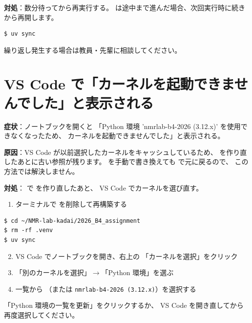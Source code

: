 \textbf{対処}：数分待ってから再実行する。
 は途中まで進んだ場合、次回実行時に続きから再開します。

\begin{wslbox}[再実行]
\begin{lstlisting}[style=bash]
$ uv sync
\end{lstlisting}
\end{wslbox}

繰り返し発生する場合は教員・先輩に相談してください。

\section{VS Code で「カーネルを起動できませんでした」と表示される}

\textbf{症状}：ノートブックを開くと
「Python 環境 'nmrlab-b4-2026 (3.12.x)' を使用できなくなったため、
カーネルを起動できませんでした」と表示される。

\textbf{原因}：VS Code が以前選択したカーネルをキャッシュしているため、
 を作り直したあとに古い参照が残ります。
 を手動で書き換えても  で元に戻るので、
この方法では解決しません。

\textbf{対処}： で  を作り直したあと、
VS Code でカーネルを選び直す。

\begin{enumerate}
  \item ターミナルで  を削除して再構築する
\end{enumerate}

\begin{wslbox}
\begin{lstlisting}[style=bash]
$ cd ~/NMR-lab-kadai/2026_B4_assignment
$ rm -rf .venv
$ uv sync
\end{lstlisting}
\end{wslbox}

\begin{enumerate}
  \setcounter{enumi}{1}
  \item VS Code でノートブックを開き、右上の
    「カーネルを選択」をクリック
  \item 「別のカーネルを選択」$\rightarrow$「Python 環境」を選ぶ
  \item 一覧から （または
    \texttt{nmrlab-b4-2026 (3.12.x)}）を選択する
\end{enumerate}

\begin{notebox}[一覧に出ない場合]
「Python 環境の一覧を更新」をクリックするか、
VS Code を開き直してから再度選択してください。
\end{notebox}

